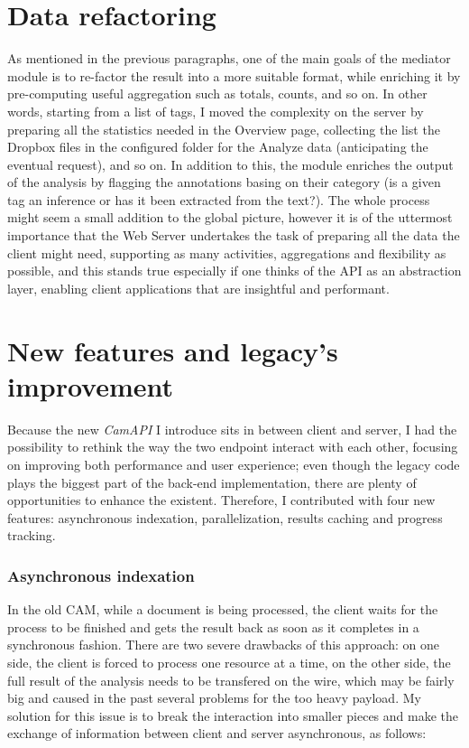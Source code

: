 \documentclass[12pt,svgnames]{memoir}
\begin{document}
\section{Data refactoring}\label{data-refactoring}

As mentioned in the previous paragraphs, one of the main goals of the
mediator module is to re-factor the result into a more suitable format,
while enriching it by pre-computing useful aggregation such as totals,
counts, and so on. In other words, starting from a list of tags, I moved
the complexity on the server by preparing all the statistics needed in
the Overview page, collecting the list the Dropbox files in the
configured folder for the Analyze data (anticipating the eventual
request), and so on. In addition to this, the module enriches the output
of the analysis by flagging the annotations basing on their category (is
a given tag an inference or has it been extracted from the text?). The
whole process might seem a small addition to the global picture, however
it is of the uttermost importance that the Web Server undertakes the
task of preparing all the data the client might need, supporting as many
activities, aggregations and flexibility as possible, and this stands
true especially if one thinks of the API as an abstraction layer,
enabling client applications that are insightful and performant.

\section{New features and legacy's
improvement}\label{new-features-and-legacys-improvement}

Because the new \emph{CamAPI} I introduce sits in between client and
server, I had the possibility to rethink the way the two endpoint
interact with each other, focusing on improving both performance and
user experience; even though the legacy code plays the biggest part of
the back-end implementation, there are plenty of opportunities to
enhance the existent. Therefore, I contributed with four new features:
asynchronous indexation, parallelization, results caching and progress
tracking.

\subsubsection*{Asynchronous indexation}\label{asynchronous-indexation}

In the old CAM, while a document is being processed, the client waits
for the process to be finished and gets the result back as soon as it
completes in a synchronous fashion. There are two severe drawbacks of
this approach: on one side, the client is forced to process one resource
at a time, on the other side, the full result of the analysis needs to
be transfered on the wire, which may be fairly big and caused in the
past several problems for the too heavy payload. My solution for this
issue is to break the interaction into smaller pieces and make the
exchange of information between client and server asynchronous, as
follows:
\end{document}
